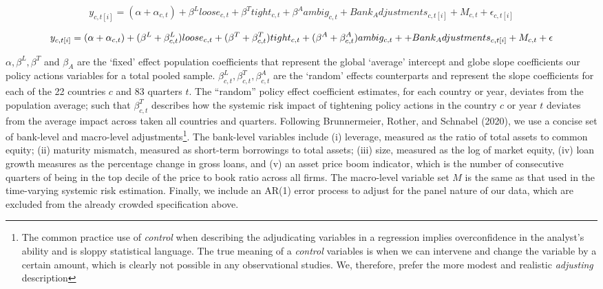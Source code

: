 \documentclass[
  10pt,
]{article}
\begin{document}
\begin{equation}\label{eq:eq8}
 y_{c,t[i]} = (\alpha + \alpha_{c,t}) + \beta^L loose_{c,t}+\beta^T tight_{c,t}+\beta^A ambig_{c,t}+Bank_Adjustments_{c,t[i]}+M_{c,t}+\epsilon_{c,t[i]}
\end{equation}

\begin{equation}\label{eq:eq9}
y_{c,t[i]} = (\alpha + \alpha_{c,t}) + (\beta^L+\beta^L_{c,t})loose_{c,t}+(\beta^T+\beta^T_{c,t})tight_{c,t} \\
  +(\beta^A+\beta^A_{c,t})ambig_{c,t}++Bank_Adjustments_{c,t[i]}+M_{c,t}+\epsilon
\end{equation}

\(\alpha, \beta^L, \beta^T\) and \(\beta_A\) are the `fixed' effect
population coefficients that represent the global `average' intercept
and globe slope coefficients our policy actions variables for a total
pooled sample. \(\beta^L_{c,t},\beta^T_{c,t},\beta^A_{c,t}\) are the
`random' effects counterparts and represent the slope coefficients for
each of the 22 countries \(c\) and 83 quarters \(t\). The ``random''
policy effect coefficient estimates, for each country or year, deviates
from the population average; such that \(\beta^T_{c,t}\) describes how
the systemic risk impact of tightening policy actions in the country
\(c\) or year \(t\) deviates from the average impact across taken all
countries and quarters. Following Brunnermeier, Rother, and Schnabel
(2020), we use a concise set of bank-level and macro-level
adjustments\footnote{The common practice use of \emph{control} when
  describing the adjudicating variables in a regression implies
  overconfidence in the analyst's ability and is sloppy statistical
  language. The true meaning of a \emph{control} variables is when we
  can intervene and change the variable by a certain amount, which is
  clearly not possible in any observational studies. We, therefore,
  prefer the more modest and realistic \emph{adjusting} description}.
The bank-level variables include (i) leverage, measured as the ratio of
total assets to common equity; (ii) maturity mismatch, measured as
short-term borrowings to total assets; (iii) size, measured as the log
of market equity, (iv) loan growth measures as the percentage change in
gross loans, and (v) an asset price boom indicator, which is the number
of consecutive quarters of being in the top decile of the price to book
ratio across all firms. The macro-level variable set \(M\) is the same
as that used in the time-varying systemic risk estimation. Finally, we
include an AR(1) error process to adjust for the panel nature of our
data, which are excluded from the already crowded specification above.
\end{document}
